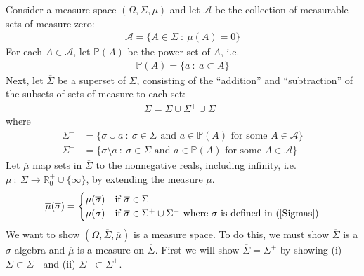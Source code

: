 \documentclass[12pt]{article}
\theoremstyle{plain}
\begin{document}
Consider a measure space $(\Omega, \Sigma, \mu)$ and let $\mathcal{A}$ be the collection of measurable sets of measure zero:
\begin{align*}
    \mathcal{A} = \{A \in \Sigma\ :\ \mu(A) = 0\}
\end{align*}
For each $A \in \mathcal{A}$, let $\mathbb{P}(A)$ be the power set of $A$, i.e.
\begin{align*}
    \mathbb{P}(A) = \{a\ :\ a \subset A\}
\end{align*}
Next, let $\overline{\Sigma}$ be a superset of $\Sigma$, consisting of the ``addition'' and ``subtraction'' of the subsets of sets of measure to each set:
\begin{align*}
    \overline{\Sigma} = \Sigma \cup \Sigma^+ \cup \Sigma^-
\end{align*}
where
\begin{equation}
    \label{Sigmas}
    \begin{aligned}
        \Sigma^+ &= \{\sigma \cup a\ :\ \sigma \in \Sigma \text{ and } a \in \mathbb{P}(A) \text{ for some } A \in \mathcal{A}\} \\
        \Sigma^- &= \{\sigma \setminus a\ :\ \sigma\in \Sigma \text{ and } a \in \mathbb{P}(A) \text{ for some } A \in \mathcal{A}\}
    \end{aligned}
\end{equation}
Let $\overline{\mu}$ map sets in $\overline{\Sigma}$ to the nonnegative reals, including infinity, i.e.~$\mu\ :\ \overline{\Sigma} \rightarrow \mathbb{R}_0^+ \cup \{\infty\}$, by extending the measure $\mu$.
\begin{align*}
    \overline{\mu}(\overline{\sigma}) = \begin{cases}
        \mu(\overline{\sigma}) & \text{if }\overline{\sigma} \in \Sigma \\
        \mu(\sigma) & \text{if } \overline{\sigma} \in \Sigma^+ \cup \Sigma^- \text{ where $\sigma$ is defined in (\ref{Sigmas})}
    \end{cases}
\end{align*}
We want to show $(\Omega, \overline{\Sigma}, \overline{\mu})$ is a measure space.  To do this, we must show $\overline{\Sigma}$ is a $\sigma$-algebra and $\overline{\mu}$ is a measure on $\overline{\Sigma}$.  First we will show $\overline{\Sigma} = \Sigma^+$ by showing (i) $\Sigma \subset \Sigma^+$ and (ii) $\Sigma^- \subset \Sigma^+$.
\end{document}
